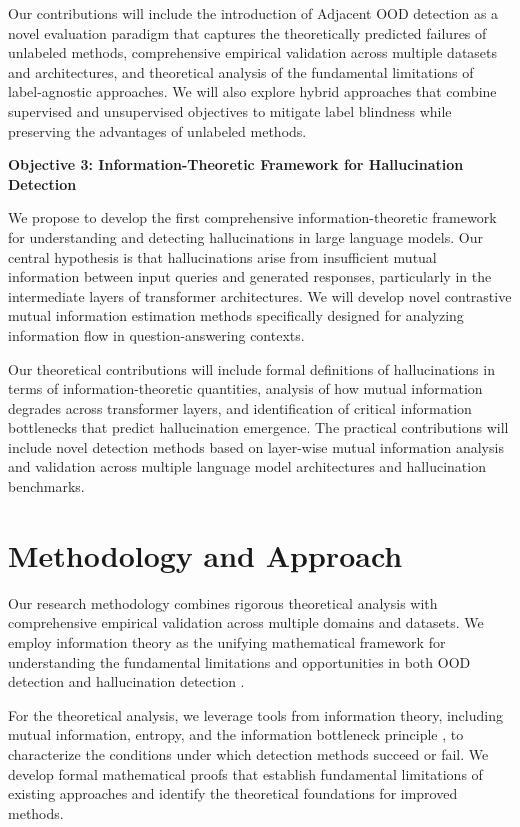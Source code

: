 \documentclass[11pt, oneside]{book}
\theoremstyle{plain}
\theoremstyle{definition}
\theoremstyle{remark}
\begin{document}
Our contributions will include the introduction of Adjacent OOD detection as a novel evaluation paradigm that captures the theoretically predicted failures of unlabeled methods, comprehensive empirical validation across multiple datasets and architectures, and theoretical analysis of the fundamental limitations of label-agnostic approaches. We will also explore hybrid approaches that combine supervised and unsupervised objectives to mitigate label blindness while preserving the advantages of unlabeled methods.

\textbf{Objective 3: Information-Theoretic Framework for Hallucination Detection}

We propose to develop the first comprehensive information-theoretic framework for understanding and detecting hallucinations in large language models. Our central hypothesis is that hallucinations arise from insufficient mutual information between input queries and generated responses, particularly in the intermediate layers of transformer architectures. We will develop novel contrastive mutual information estimation methods specifically designed for analyzing information flow in question-answering contexts.

Our theoretical contributions will include formal definitions of hallucinations in terms of information-theoretic quantities, analysis of how mutual information degrades across transformer layers, and identification of critical information bottlenecks that predict hallucination emergence. The practical contributions will include novel detection methods based on layer-wise mutual information analysis and validation across multiple language model architectures and hallucination benchmarks.

\section{Methodology and Approach}

Our research methodology combines rigorous theoretical analysis with comprehensive empirical validation across multiple domains and datasets. We employ information theory as the unifying mathematical framework for understanding the fundamental limitations and opportunities in both OOD detection and hallucination detection \citep{shannon1948mathematical,cover1999elements}.

For the theoretical analysis, we leverage tools from information theory, including mutual information, entropy, and the information bottleneck principle \citep{tishby2000information}, to characterize the conditions under which detection methods succeed or fail. We develop formal mathematical proofs that establish fundamental limitations of existing approaches and identify the theoretical foundations for improved methods.
\end{document}
